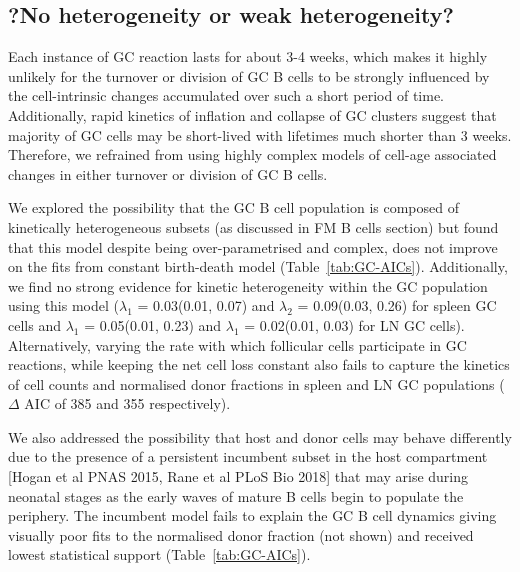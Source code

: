 \documentclass[11pt]{article}
\newcommand{\red}[1]{{\color{red}{#1}}}
\begin{document}
	\subsection*{?No heterogeneity or weak heterogeneity?}
	Each instance of GC reaction lasts for about 3-4 weeks, which makes it highly unlikely for the turnover or division of GC B cells to be strongly influenced by the cell-intrinsic changes accumulated over such a short period of time.
	Additionally, rapid kinetics of inflation and collapse of GC clusters suggest that majority of GC cells may be short-lived with lifetimes much shorter than 3 weeks.
	Therefore, we refrained from using highly complex models of cell-age associated changes in either turnover or division of GC B cells.
	
	We explored the possibility that the GC B cell population is composed of kinetically heterogeneous subsets (as discussed in FM B cells section) but found that this model despite being over-parametrised and complex, does not improve on the fits from constant birth-death model (Table~\ref{tab:GC-AICs}).
	Additionally, we find no strong evidence for kinetic heterogeneity within the GC population using this model ($\lambda_1$ = 0.03(0.01, 0.07) and $\lambda_2$ = 0.09(0.03, 0.26) for spleen GC cells and $\lambda_1$ = 0.05(0.01, 0.23) and $\lambda_1$ = 0.02(0.01, 0.03) for LN GC cells).
	Alternatively, varying the rate with which follicular cells participate in GC reactions, while keeping the net cell loss constant also fails to capture the kinetics of cell counts and normalised donor fractions in spleen and LN GC populations ($\Delta$ AIC of 385 and 355 respectively).
	
	\red{I have fitted the age-structured model on GC cells and it fails to fit to LN GCs and show $\Delta$ AIC of 380 in spleen GCs.}
	
	We also addressed the possibility that host and donor cells may behave differently due to the presence of a persistent incumbent subset in the host compartment [Hogan et al PNAS 2015, Rane et al PLoS Bio 2018] that may arise during neonatal stages as the early waves of mature B cells begin to populate the periphery.
	The incumbent model fails to explain the GC B cell dynamics giving visually poor fits to the normalised donor fraction (not shown) and received lowest statistical support (Table~\ref{tab:GC-AICs}).
		
	
\end{document}
